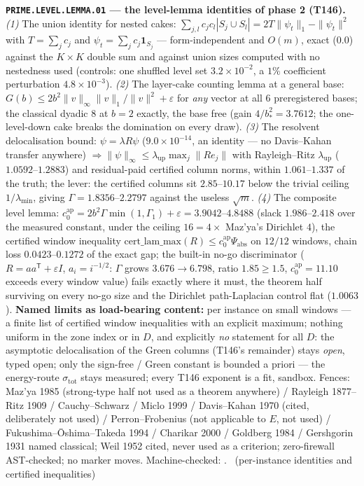 \par\smallskip\noindent\textbf{\texttt{PRIME.LEVEL.LEMMA.01} --- the
level-lemma identities of phase 2 (T146).}
\emph{(1)} The union identity for nested cakes:
$\sum_{j,l}c_jc_l|S_j\cup S_l|=2T\|\psi_t\|_1-\|\psi_t\|^2$ with $T=\sum_jc_j$
and $\psi_t=\sum_jc_j\mathbf 1_{S_j}$ --- form-independent and $O(m)$, exact
($0.0$) against the $K\times K$ double sum and against union sizes computed
with no nestedness used (controls: one shuffled level set $3.2\times10^{-2}$,
a $1\%$ coefficient perturbation $4.8\times10^{-3}$). \emph{(2)} The
layer-cake counting lemma at a general base:
$G(b)\le2b^2\|v\|_\infty\|v\|_1/\|v\|^2+\varepsilon$ for \emph{any} vector at
all $6$ preregistered bases; the classical dyadic $8$ at $b=2$ exactly, the
base free (gain $4/b_*^2=3.7612$; the one-level-down cake breaks the
domination on every draw). \emph{(3)} The resolvent delocalisation bound:
$\psi=\lambda R\psi$ ($9.0\times10^{-14}$, an identity --- no Davis--Kahan
transfer anywhere) $\Rightarrow\|\psi\|_\infty\le\lambda_{\mathrm{up}}
\max_j\|Re_j\|$ with Rayleigh--Ritz $\lambda_{\mathrm{up}}$
($1.0592$--$1.2883$) and residual-paid certified column norms, within
$1.061$--$1.337$ of the truth; the lever: the certified columns sit
$2.85$--$10.17$ below the trivial ceiling $1/\lambda_{\min}$, giving
$\Gamma=1.8356$--$2.2797$ against the useless $\sqrt m$. \emph{(4)} The
composite level lemma:
$c_0^{\mathrm{ap}}=2b^2\Gamma\min(1,\Gamma_1)+\varepsilon=3.9042$--$4.8488$
(slack $1.986$--$2.418$ over the measured constant, under the ceiling
$16=4\times$ Maz'ya's Dirichlet $4$), the certified window inequality
$\mathrm{cert\_lam\_max}(R)\le c_0^{\mathrm{ap}}\Psi_{\mathrm{abs}}$ on
$12/12$ windows, chain loss $0.0423$--$0.1272$ of the exact gap; the built-in
no-go discriminator ($R=aa^{\mathsf T}+\varepsilon I$, $a_i=i^{-1/2}$:
$\Gamma$ grows $3.676\to6.798$, ratio $1.85\ge1.5$, $c_0^{\mathrm{ap}}=11.10$
exceeds every window value) fails exactly where it must, the theorem half
surviving on every no-go size and the Dirichlet path-Laplacian control flat
($1.0063$).
\textbf{Named limits as load-bearing content:} per instance on small windows
--- a finite list of certified window inequalities with an explicit maximum;
nothing uniform in the zone index or in $D$, and explicitly \emph{no}
statement for all $D$: the asymptotic delocalisation of the Green columns
(T146's remainder) stays \emph{open}, typed open; only the sign-free / Green
constant is bounded a priori --- the energy-route $\sigma_{\mathrm{tot}}$
stays measured; every T146 exponent is a fit, sandbox. Fences: Maz'ya 1985
(strong-type half not used as a theorem anywhere) / Rayleigh 1877--Ritz 1909 /
Cauchy--Schwarz / Miclo 1999 / Davis--Kahan 1970 (cited, deliberately not
used) / Perron--Frobenius (not applicable to $E$, not used) /
Fukushima--\=Oshima--Takeda 1994 / Charikar 2000 / Goldberg 1984 / Gershgorin
1931 named classical; Weil 1952 cited, never used as a criterion;
zero-firewall AST-checked; no marker moves.
Machine-checked: .
\mE\ (per-instance identities and certified inequalities)


